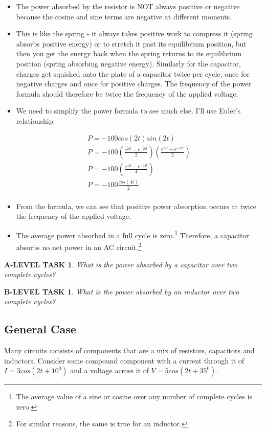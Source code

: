 \documentclass{book}
\numberwithin{equation}{section}
\newtheorem{alevel}{A-LEVEL TASK}
\newtheorem{blevel}{B-LEVEL TASK}
\theoremstyle{definition}
\begin{document}
\begin{itemize}
\item The power absorbed by the resistor is NOT always positive or negative because the cosine and sine terms are negative at different moments.
\item This is like the spring - it always takes positive work to compress it (spring absorbs positive energy) or to stretch it past its equilibrium position, but then you get the energy back when the spring returns to its equilibrium position (spring absorbing negative energy). Similarly for the capacitor, charges get squished onto the plate of a capacitor twice per cycle, once for negative charges and once for positive charges. The frequency of the power formula should therefore be twice the frequency of the applied voltage.
\item We need to simplify the power formula to see much else. I'll use Euler's relationship:

\begin{align*}
P=-100cos(2t)sin(2t)\\
P = -100(\frac{e^{2it}-e^{-2it}}{2})(\frac{e^{2it}+e^{-2it}}{2})\\
P=-100(\frac{e^{4it}-e^{-4it}}{4})\\
P=-100\frac{cos(4t)}{2}\\
\end{align*}
 
\item From the formula, we can see that positive power absorption occurs at twice the frequency of the applied voltage.  
\item The average power absorbed in a full cycle is zero.\footnote{The average value of a sine or cosine over any number of complete cycles is zero.} Therefore, a capacitor absorbs no net power in an AC circuit.\footnote{For similar reasons, the same is true for an inductor.}
\end{itemize}

\begin{alevel}
What is the power absorbed by a capacitor over two complete cycles?
\end{alevel}

\begin{blevel}
What is the power absorbed by an inductor over two complete cycles?
\end{blevel}

\subsection{General Case}
Many circuits consists of components that are a mix of resistors, capacitors and inductors. Consider some compound component with a current through it of $I=3cos(2t+10^0)$ and a voltage across it of $V=5cos(2t+35^0)$.\\
\end{document}
